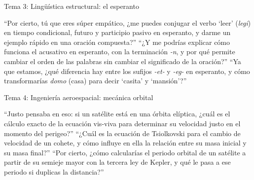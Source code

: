 \begin{frame}{Tema 3: Lingüística estructural: el esperanto}
  \footnotesize
  \begin{enumerate}
    \setlength{\itemsep}{0.12cm}
      {\enquote{Por cierto, tú que eres súper empático, ¿me puedes conjugar el verbo \enquote{leer} (\textit{legi}) en tiempo condicional, futuro y participio pasivo en esperanto, y darme un ejemplo rápido en una oración compuesta?}}
      {\enquote{¿Y me podrías explicar cómo funciona el acusativo en esperanto, con la terminación \textit{-n}, y por qué permite cambiar el orden de las palabras sin cambiar el significado de la oración?}}
      {\enquote{Ya que estamos, ¿qué diferencia hay entre los sufijos \textit{-et-} y \textit{-eg-} en esperanto, y cómo transformarías \textit{domo} (casa) para decir \enquote{casita} y \enquote{mansión}?}}
  \end{enumerate}
\end{frame}

\begin{frame}{Tema 4: Ingeniería aeroespacial: mecánica orbital}
  \footnotesize
  \begin{enumerate}
    \setlength{\itemsep}{0.12cm}
      {\enquote{Justo pensaba en eso: si un satélite está en una órbita elíptica, ¿cuál es el cálculo exacto de la ecuación vis-viva para determinar su velocidad justo en el momento del perigeo?}}
      {\enquote{¿Cuál es la ecuación de Tsiolkovski para el cambio de velocidad de un cohete, y cómo influye en ella la relación entre su masa inicial y su masa final?}}
      {\enquote{Por cierto, ¿cómo calcularías el periodo orbital de un satélite a partir de su semieje mayor con la tercera ley de Kepler, y qué le pasa a ese periodo si duplicas la distancia?}}
  \end{enumerate}
\end{frame}

